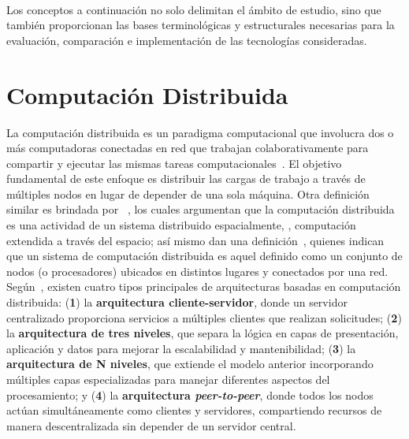 \label{cap:marcoConceptual}
\mbox{}\\

\noindent
Los conceptos a continuación no solo delimitan el ámbito de estudio, sino que también proporcionan las bases terminológicas y estructurales necesarias para la evaluación, comparación e implementación de las tecnologías consideradas.

\noindent
\section{Computación Distribuida}
\noindent
La computación distribuida es un paradigma computacional que involucra dos o más computadoras conectadas en red que trabajan colaborativamente para compartir y ejecutar las mismas tareas computacionales~\citep{Ali2015}. El objetivo fundamental de este enfoque es distribuir las cargas de trabajo a través de múltiples nodos en lugar de depender de una sola máquina. Otra definición similar es brindada por ~\cite{Lamport1990}, los cuales argumentan que la computación distribuida es una actividad  de un sistema distribuido espacialmente, \ie, computación extendida a través del espacio; así mismo dan una definición~\cite{Chang1995}, quienes indican que un sistema de computación distribuida es aquel definido como un conjunto de nodos (o procesadores) ubicados en distintos lugares y conectados por una red. Según~\cite{AWS01}, existen cuatro tipos principales de arquitecturas basadas en computación distribuida: (\textbf{1}) la \textbf{arquitectura cliente-servidor}, donde un servidor centralizado proporciona servicios a múltiples clientes que realizan solicitudes; (\textbf{2}) la \textbf{arquitectura de tres niveles}, que separa la lógica en capas de presentación, aplicación y datos para mejorar la escalabilidad y mantenibilidad; (\textbf{3}) la \textbf{arquitectura de N niveles}, que extiende el modelo anterior incorporando múltiples capas especializadas para manejar diferentes aspectos del procesamiento; y (\textbf{4}) la \textbf{arquitectura \textit{peer-to-peer}}, donde todos los nodos actúan simultáneamente como clientes y servidores, compartiendo recursos de manera descentralizada sin depender de un servidor central.

